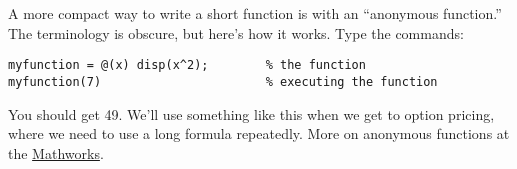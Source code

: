 \documentclass[11pt]{exam}
\begin{document}
\begin{questions}
\begin{parts}
\item A more compact way to write a short function is with an
``anonymous function.''
The terminology is obscure, but here's how it works.
Type the commands:
\begin{verbatim}
myfunction = @(x) disp(x^2);        % the function
myfunction(7)                       % executing the function
\end{verbatim}
You should get 49.
We'll use something like this when we get to option pricing,
where we need to use a long formula repeatedly.
More on anonymous functions at the
\href{http://www.mathworks.com/help/matlab/matlab_prog/anonymous-functions.html}{Mathworks}.
\end{parts}

\end{questions}


\end{document}
